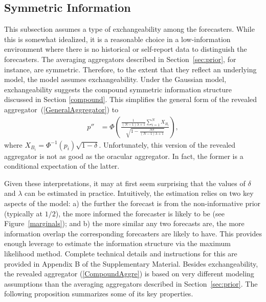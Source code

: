\documentclass[12pt]{article}
\theoremstyle{definition}
\theoremstyle{definition}
\begin{document}
\subsection{Symmetric Information}
\label{compound2}
This subsection assumes a type of exchangeability among the forecasters.
While this is somewhat idealized, it is a reasonable choice in a
low-information environment where there is no historical or
self-report data to distinguish the forecasters.  The averaging
aggregators described in Section~\ref{sec:prior}, for instance, are
symmetric. Therefore, to the extent that they reflect an underlying
model, the model assumes exchangeability.  Under the Gaussian model, exchangeability suggests the compound
symmetric information structure discussed in Section \ref{compound}. This simplifies the general form of the revealed aggregator~(\ref{GeneralAggregator})  to
\begin{align}
p''
  &=\Phi\left(\frac{\frac{1}{(N-1)\lambda +1} 
  \sum_{i=1}^N X_{B_i} }{\sqrt{1- \frac{N\delta}{(N-1)\lambda +1} }}  
  \right), \label{CompoundAggre}
\end{align}
 where $X_{B_i} =
\Phi^{-1}(p_i)\sqrt{1-\delta}$. 
Unfortunately, this version of the revealed aggregator is not as good as the oracular
aggregator. In fact, the former is a conditional expectation of the latter.

Given these interpretations, it may at first seem surprising that the
values of $\delta$ and $\lambda$ can be estimated in practice.
Intuitively, the estimation relies on two key aspects of the model: a)
the further the forecast is from the non-informative prior (typically
at $1/2$), the more informed the forecaster is likely to be (see
Figure~\ref{marginals}); and b) the more similar any two forecasts
are, the more information overlap the corresponding forecasters are
likely to have. This provides enough leverage to estimate the
information structure via the maximum likelihood method.  Complete
technical details and instructions for this are provided in 
Appendix B of the Supplementary Material.  Besides exchangeability, the revealed aggregator
(\ref{CompoundAggre}) is based on very different modeling assumptions
than the averaging aggregators described in
Section~\ref{sec:prior}. The following proposition summarizes some of
its key properties.
\end{document}
